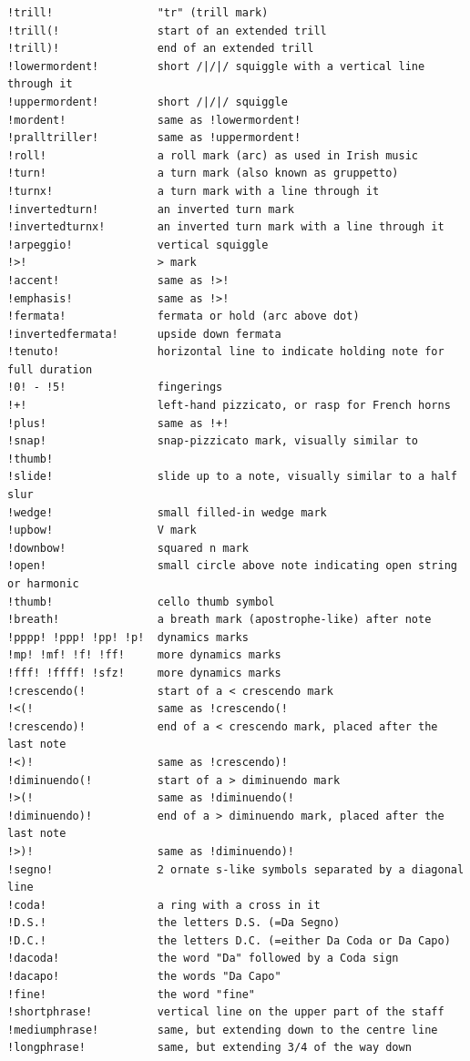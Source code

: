 \documentclass[oneside]{book}
\begin{document}
\begin{verbatim}
!trill!                "tr" (trill mark)
!trill(!               start of an extended trill
!trill)!               end of an extended trill
!lowermordent!         short /|/|/ squiggle with a vertical line through it
!uppermordent!         short /|/|/ squiggle
!mordent!              same as !lowermordent!
!pralltriller!         same as !uppermordent!
!roll!                 a roll mark (arc) as used in Irish music
!turn!                 a turn mark (also known as gruppetto)
!turnx!                a turn mark with a line through it
!invertedturn!         an inverted turn mark
!invertedturnx!        an inverted turn mark with a line through it
!arpeggio!             vertical squiggle
!>!                    > mark
!accent!               same as !>!
!emphasis!             same as !>!
!fermata!              fermata or hold (arc above dot)
!invertedfermata!      upside down fermata
!tenuto!               horizontal line to indicate holding note for full duration
!0! - !5!              fingerings
!+!                    left-hand pizzicato, or rasp for French horns
!plus!                 same as !+!
!snap!                 snap-pizzicato mark, visually similar to !thumb!
!slide!                slide up to a note, visually similar to a half slur
!wedge!                small filled-in wedge mark
!upbow!                V mark
!downbow!              squared n mark
!open!                 small circle above note indicating open string or harmonic
!thumb!                cello thumb symbol
!breath!               a breath mark (apostrophe-like) after note
!pppp! !ppp! !pp! !p!  dynamics marks
!mp! !mf! !f! !ff!     more dynamics marks
!fff! !ffff! !sfz!     more dynamics marks
!crescendo(!           start of a < crescendo mark
!<(!                   same as !crescendo(!
!crescendo)!           end of a < crescendo mark, placed after the last note
!<)!                   same as !crescendo)!
!diminuendo(!          start of a > diminuendo mark
!>(!                   same as !diminuendo(!
!diminuendo)!          end of a > diminuendo mark, placed after the last note
!>)!                   same as !diminuendo)!
!segno!                2 ornate s-like symbols separated by a diagonal line
!coda!                 a ring with a cross in it
!D.S.!                 the letters D.S. (=Da Segno)
!D.C.!                 the letters D.C. (=either Da Coda or Da Capo)
!dacoda!               the word "Da" followed by a Coda sign
!dacapo!               the words "Da Capo"
!fine!                 the word "fine"
!shortphrase!          vertical line on the upper part of the staff
!mediumphrase!         same, but extending down to the centre line
!longphrase!           same, but extending 3/4 of the way down
\end{verbatim}
\end{document}
